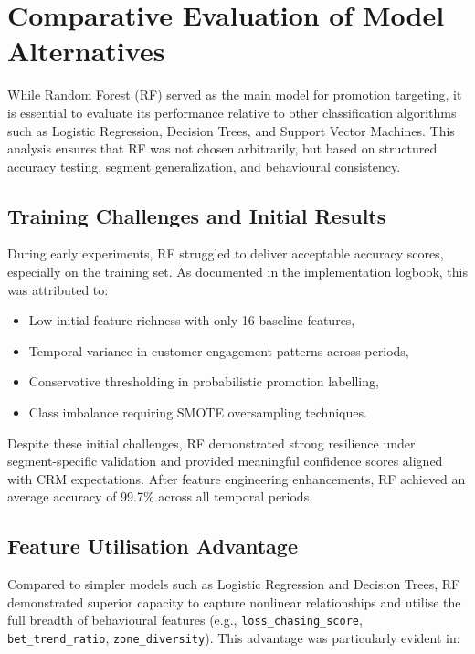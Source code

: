 \section{Comparative Evaluation of Model Alternatives}
\label{sec:model_comparison}

While Random Forest (RF) served as the main model for promotion targeting, it is essential to evaluate its performance relative to other classification algorithms such as Logistic Regression, Decision Trees, and Support Vector Machines. This analysis ensures that RF was not chosen arbitrarily, but based on structured accuracy testing, segment generalization, and behavioural consistency.

\subsection*{Training Challenges and Initial Results}

During early experiments, RF struggled to deliver acceptable accuracy scores, especially on the training set. As documented in the implementation logbook, this was attributed to:

\begin{itemize}
\item Low initial feature richness with only 16 baseline features,
\item Temporal variance in customer engagement patterns across periods,
\item Conservative thresholding in probabilistic promotion labelling,
\item Class imbalance requiring SMOTE oversampling techniques.
\end{itemize}

Despite these initial challenges, RF demonstrated strong resilience under segment-specific validation and provided meaningful confidence scores aligned with CRM expectations. After feature engineering enhancements, RF achieved an average accuracy of 99.7\% across all temporal periods.

\subsection*{Feature Utilisation Advantage}

Compared to simpler models such as Logistic Regression and Decision Trees, RF demonstrated superior capacity to capture nonlinear relationships and utilise the full breadth of behavioural features (e.g., \texttt{loss\_chasing\_score}, \texttt{bet\_trend\_ratio}, \texttt{zone\_diversity}). This advantage was particularly evident in:

